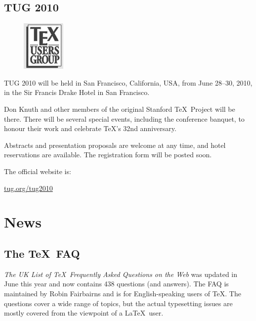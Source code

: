 \documentclass[a4paper,twoside,twocolumn]{article}
\begin{document}
\subsection{TUG 2010}


\begin{figure}
    \vspace{-20pt} %
    \includegraphics{tug_bw.jpg}
    \vspace{-10pt} %
\end{figure}



TUG 2010 will be held in San Francisco, California, USA, from
  June 28--30, 2010, in the Sir Francis Drake Hotel in San Francisco.

Don Knuth and other members of the original Stanford \TeX\ Project will be there.  There will be several special events, including the conference banquet, to honour their work and celebrate \TeX's 32nd anniversary.

Abstracts and presentation proposals are welcome at any time, and hotel reservations are available. The registration form will be posted soon.

The official website is:
\begin{center}
 \href{http://tug.org/tug2010/}{tug.org/tug2010}
\end{center}


\section{News}
\subsection{The \TeX\ FAQ}
\emph{The UK List of \TeX\ Frequently Asked Questions on the Web} was updated in June this year and now contains 438 questions (and answers). The FAQ is maintained by Robin Fairbairns and is for English-speaking users of \TeX. The questions cover a wide range of topics, but the actual typesetting issues are mostly covered from the viewpoint of a \LaTeX\ user. 
\end{document}
